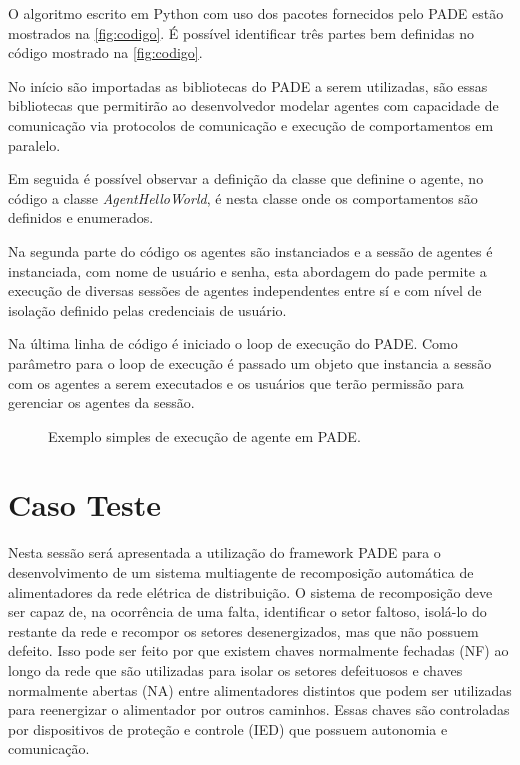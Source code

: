 \documentclass[journal]{IEEEtran}
\begin{document}
O algoritmo escrito em Python com uso dos pacotes fornecidos pelo PADE estão mostrados na \autoref{fig:codigo}. É possível identificar três partes bem definidas no código mostrado na \autoref{fig:codigo}. 

No início são importadas as bibliotecas do PADE a serem utilizadas, são essas bibliotecas que permitirão ao desenvolvedor modelar agentes com capacidade de comunicação via protocolos de comunicação e execução de comportamentos em paralelo.

Em seguida é possível observar a definição da classe que definine o agente, no código a classe \textit{AgentHelloWorld}, é nesta classe onde os comportamentos são definidos e enumerados.

Na segunda parte do código os agentes são instanciados e a sessão de agentes é instanciada, com nome de usuário e senha, esta abordagem do pade permite a execução de diversas sessões de agentes independentes entre sí e com nível de isolação definido pelas credenciais de usuário.

Na última linha de código é iniciado o loop de execução do PADE. Como parâmetro para o loop de execução é passado um objeto que instancia a sessão com os agentes a serem executados e os usuários que terão permissão para gerenciar os agentes da sessão.

\begin{figure}[htb]
  \centering
  
  \caption{\label{fig:codigo}Exemplo simples de execução de agente em PADE.}
\end{figure}

\section{Caso Teste}

Nesta sessão será apresentada a utilização do framework PADE para o desenvolvimento de um sistema multiagente de recomposição automática de alimentadores da rede elétrica de distribuição. O sistema de recomposição deve ser capaz de, na ocorrência de uma falta, identificar o setor faltoso, isolá-lo do restante da rede e recompor os setores desenergizados, mas que não possuem defeito. Isso pode ser feito por que existem chaves normalmente fechadas (NF) ao longo da rede que são utilizadas para isolar os setores defeituosos e chaves normalmente abertas (NA) entre alimentadores distintos que podem ser utilizadas para reenergizar o alimentador por outros caminhos. Essas chaves são controladas por dispositivos de proteção e controle (IED) que possuem autonomia e comunicação.
\end{document}
